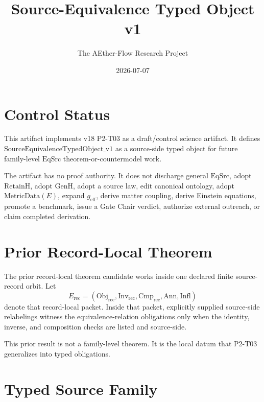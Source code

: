 \documentclass[11pt]{article}
\title{Source-Equivalence Typed Object v1}
\author{The AEther-Flow Research Project}
\date{2026-07-07}
\newcommand{\EqSrc}{\mathrm{EqSrc}}
\newcommand{\RetainH}{\mathrm{RetainH}}
\newcommand{\GenH}{\mathrm{GenH}}
\newcommand{\SourceEquivalenceTypedObject}{\mathrm{SourceEquivalenceTypedObject\_v1}}
\begin{document}
\maketitle

\section{Control Status}

This artifact implements v18 P2-T03 as a draft/control science artifact. It
defines \(\SourceEquivalenceTypedObject\) as a source-side typed object for
future family-level \(\EqSrc\) theorem-or-countermodel work.

The artifact has no proof authority. It does not discharge general \(\EqSrc\),
adopt \(\RetainH\), adopt \(\GenH\), adopt a source law, edit canonical
ontology, adopt \(\mathrm{MetricData}(E)\), expand \(g_{\mathrm{eff}}\), derive
matter coupling, derive Einstein equations, promote a benchmark, issue a Gate
Chair verdict, authorize external outreach, or claim completed derivation.

\section{Prior Record-Local Theorem}

The prior record-local theorem candidate works inside one declared finite
source-record orbit. Let
\[
  E_{\mathrm{rec}} = (\mathrm{Obj}_{\mathrm{rec}},
  \mathrm{Inv}_{\mathrm{rec}}, \mathrm{Cmp}_{\mathrm{rec}},
  \mathrm{Ann}, \mathrm{Infl})
\]
denote that record-local packet. Inside that packet, explicitly supplied
source-side relabelings witness the equivalence-relation obligations only
when the identity, inverse, and composition checks are listed and source-side.

This prior result is not a family-level theorem. It is the local datum that
P2-T03 generalizes into typed obligations.

\section{Typed Source Family}
\end{document}
